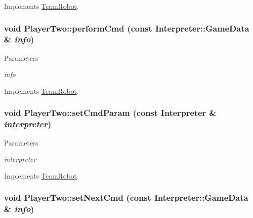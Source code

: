 Implements \hyperlink{classTeamRobot_a71ec65db46db1ac511fe17b668d4f192}{TeamRobot}.

\hypertarget{classPlayerTwo_a56d794b718c60092a324f312b8333eb9}{
\subsubsection[{performCmd}]{\setlength{\rightskip}{0pt plus 5cm}void PlayerTwo::performCmd (const {\bf Interpreter::GameData} \& {\em info})}}
\label{classPlayerTwo_a56d794b718c60092a324f312b8333eb9}

\begin{DoxyParams}{Parameters}
\item[{\em info}]\end{DoxyParams}


Implements \hyperlink{classTeamRobot_a9b84df51ca16a7203fdb6498ea6741da}{TeamRobot}.

\hypertarget{classPlayerTwo_aa0294cf24297f66ffd92f1a250794340}{
\subsubsection[{setCmdParam}]{\setlength{\rightskip}{0pt plus 5cm}void PlayerTwo::setCmdParam (const {\bf Interpreter} \& {\em interpreter})}}
\label{classPlayerTwo_aa0294cf24297f66ffd92f1a250794340}

\begin{DoxyParams}{Parameters}
\item[{\em interpreter}]\end{DoxyParams}


Implements \hyperlink{classTeamRobot_a34c0fd6986c510d4025e5752b3c0e49a}{TeamRobot}.

\hypertarget{classPlayerTwo_a7ac9a9a4f1dedee2006e6a0c79f37c0c}{
\subsubsection[{setNextCmd}]{\setlength{\rightskip}{0pt plus 5cm}void PlayerTwo::setNextCmd (const {\bf Interpreter::GameData} \& {\em info})}}
\label{classPlayerTwo_a7ac9a9a4f1dedee2006e6a0c79f37c0c}

